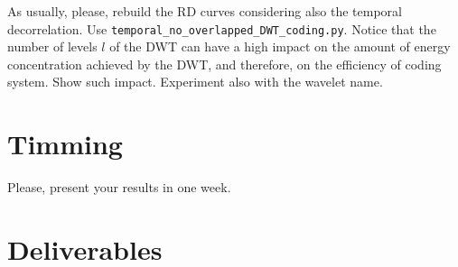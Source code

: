 As usually, please, rebuild the RD curves considering also the
temporal decorrelation. Use
\verb|temporal_no_overlapped_DWT_coding.py|. Notice that the number of
levels $l$ of the DWT can have a high impact on the amount of energy
concentration achieved by the DWT, and therefore, on the efficiency of
coding system. Show such impact. Experiment also with the wavelet
name.


\section{Timming}

Please, present your results in one week.

\section{Deliverables}

